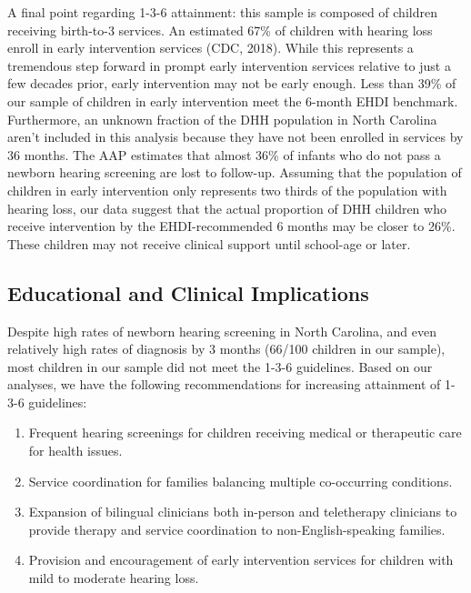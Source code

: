 \documentclass[english,man]{apa6}
\begin{document}
A final point regarding 1-3-6 attainment: this sample is composed of children receiving birth-to-3 services. An estimated 67\% of children with hearing loss enroll in early intervention services (CDC, 2018). While this represents a tremendous step forward in prompt early intervention services relative to just a few decades prior, early intervention may not be early enough. Less than 39\% of our sample of children in early intervention meet the 6-month EHDI benchmark. Furthermore, an unknown fraction of the DHH population in North Carolina aren't included in this analysis because they have not been enrolled in services by 36 months. The AAP estimates that almost 36\% of infants who do not pass a newborn hearing screening are lost to follow-up. Assuming that the population of children in early intervention only represents two thirds of the population with hearing loss, our data suggest that the actual proportion of DHH children who receive intervention by the EHDI-recommended 6 months may be closer to 26\%. These children may not receive clinical support until school-age or later.

\hypertarget{educational-and-clinical-implications}{%
\subsection{Educational and Clinical Implications}\label{educational-and-clinical-implications}}

Despite high rates of newborn hearing screening in North Carolina, and even relatively high rates of diagnosis by 3 months (66/100 children in our sample), most children in our sample did not meet the 1-3-6 guidelines. Based on our analyses, we have the following recommendations for increasing attainment of 1-3-6 guidelines:

\begin{enumerate}

\item Frequent hearing screenings for children receiving medical or therapeutic care for health issues.
\item Service coordination for families balancing multiple co-occurring conditions.
\item Expansion of bilingual clinicians both in-person and teletherapy clinicians to provide therapy and service coordination to non-English-speaking families.
\item Provision and encouragement of early intervention services for children with mild to moderate hearing loss.

\end{enumerate}
\end{document}

